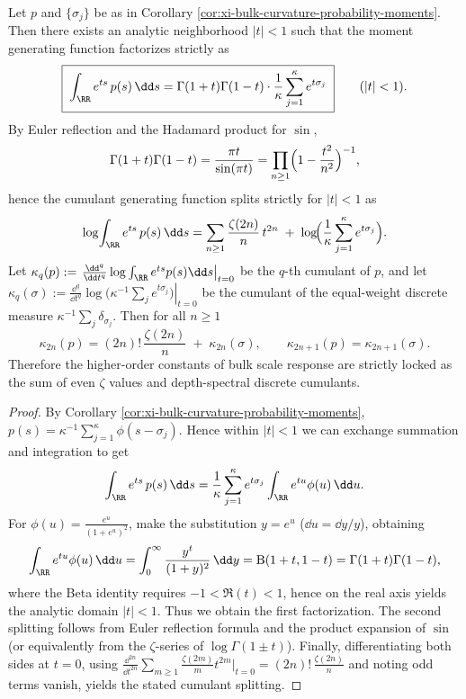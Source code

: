 \begin{proposition}\label{prop:xi-bulk-curvature-mgf-factorization-zeta-tower}
Let \(p\) and \(\{\sigma_j\}\) be as in Corollary \ref{cor:xi-bulk-curvature-probability-moments}.
Then there exists an analytic neighborhood \(|t|<1\) such that the moment generating function factorizes strictly as
\[
\boxed{\;
\int_{\RR}e^{ts}\,p(s)\,\dd s
=\Gamma(1+t)\Gamma(1-t)\cdot \frac{1}{\kappa}\sum_{j=1}^{\kappa}e^{t\sigma_j}\;}
\qquad(|t|<1).
\]
By Euler reflection and the Hadamard product for \(\sin\),
\[
\Gamma(1+t)\Gamma(1-t)=\frac{\pi t}{\sin(\pi t)}
=\prod_{n\ge 1}\Bigl(1-\frac{t^2}{n^2}\Bigr)^{-1},
\]
hence the cumulant generating function splits strictly for \(|t|<1\) as
\[
\log\!\int_{\RR}e^{ts}\,p(s)\,\dd s
=\sum_{n\ge 1}\frac{\zeta(2n)}{n}\,t^{2n}
\;+\;\log\!\Bigl(\frac{1}{\kappa}\sum_{j=1}^{\kappa}e^{t\sigma_j}\Bigr).
\]
Let \(\kappa_q(p):=\left.\frac{\dd^q}{\dd t^q}\log\int_{\RR}e^{ts}p(s)\dd s\right|_{t=0}\) be the \(q\)-th cumulant of \(p\),
and let \(\kappa_q(\sigma):=\left.\frac{\dd^q}{\dd t^q}\log\bigl(\kappa^{-1}\sum_j e^{t\sigma_j}\bigr)\right|_{t=0}\) be the cumulant of the equal-weight discrete measure \(\kappa^{-1}\sum_j\delta_{\sigma_j}\).
Then for all \(n\ge 1\)
\[
\boxed{\;
\kappa_{2n}(p)=(2n)!\,\frac{\zeta(2n)}{n}\;+\;\kappa_{2n}(\sigma),
\qquad
\kappa_{2n+1}(p)=\kappa_{2n+1}(\sigma).\;}
\]
Therefore the higher-order constants of bulk scale response are strictly locked as the sum of even \(\zeta\) values and depth-spectral discrete cumulants.
\end{proposition}
\begin{proof}
By Corollary \ref{cor:xi-bulk-curvature-probability-moments},
\(
p(s)=\kappa^{-1}\sum_{j=1}^\kappa \phi(s-\sigma_j)
\).
Hence within \(|t|<1\) we can exchange summation and integration to get
\[
\int_{\RR}e^{ts}\,p(s)\,\dd s
=\frac{1}{\kappa}\sum_{j=1}^{\kappa}e^{t\sigma_j}\int_{\RR}e^{tu}\phi(u)\,\dd u.
\]
For \(\phi(u)=\frac{e^{u}}{(1+e^{u})^{2}}\), make the substitution \(y=e^{u}\) (\(\dd u=\dd y/y\)), obtaining
\[
\int_{\RR}e^{tu}\phi(u)\,\dd u
=\int_{0}^{\infty}\frac{y^{t}}{(1+y)^{2}}\,\dd y
=\mathrm{B}(1+t,1-t)
=\Gamma(1+t)\Gamma(1-t),
\]
where the Beta identity requires \(-1<\Re(t)<1\), hence on the real axis yields the analytic domain \(|t|<1\).
Thus we obtain the first factorization.
The second splitting follows from Euler reflection formula and the product expansion of \(\sin\) (or equivalently from the \(\zeta\)-series of \(\log\Gamma(1\pm t)\)).
Finally, differentiating both sides at \(t=0\), using
\(
\frac{\dd^{2n}}{\dd t^{2n}}\sum_{m\ge 1}\frac{\zeta(2m)}{m}t^{2m}\big|_{t=0}
=(2n)!\,\frac{\zeta(2n)}{n}
\)
and noting odd terms vanish, yields the stated cumulant splitting.
\end{proof}

